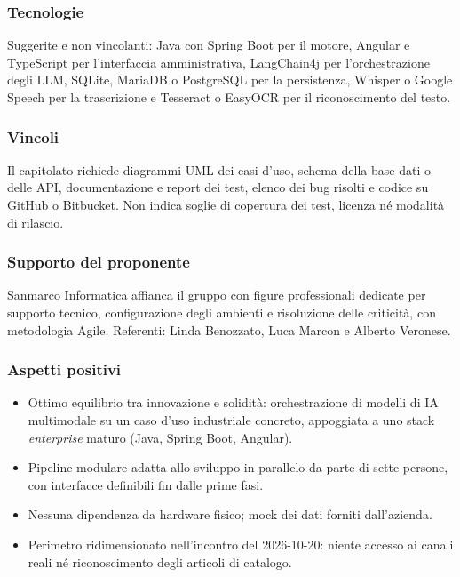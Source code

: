 \subsubsection*{Tecnologie}

Suggerite e non vincolanti: Java con Spring Boot per il motore, Angular e TypeScript per l'interfaccia amministrativa, LangChain4j per l'orchestrazione degli LLM, SQLite, MariaDB o PostgreSQL per la persistenza, Whisper o Google Speech per la trascrizione e Tesseract o EasyOCR per il riconoscimento del testo.

\subsubsection*{Vincoli}

Il capitolato richiede diagrammi UML dei casi d'uso, schema della base dati o delle API, documentazione e report dei test, elenco dei bug risolti e codice su GitHub o Bitbucket. Non indica soglie di copertura dei test, licenza né modalità di rilascio.

\subsubsection*{Supporto del proponente}

Sanmarco Informatica affianca il gruppo con figure professionali dedicate per supporto tecnico, configurazione degli ambienti e risoluzione delle criticità, con metodologia Agile. Referenti: Linda Benozzato, Luca Marcon e Alberto Veronese.

\subsubsection*{Aspetti positivi}

\begin{itemize}
    \item Ottimo equilibrio tra innovazione e solidità: orchestrazione di modelli di IA multimodale su un caso d'uso industriale concreto, appoggiata a uno stack \emph{enterprise} maturo (Java, Spring Boot, Angular).
    \item Pipeline modulare adatta allo sviluppo in parallelo da parte di sette persone, con interfacce definibili fin dalle prime fasi.
    \item Nessuna dipendenza da hardware fisico; mock dei dati forniti dall'azienda.
    \item Perimetro ridimensionato nell'incontro del 2026-10-20: niente accesso ai canali reali né riconoscimento degli articoli di catalogo.
\end{itemize}

